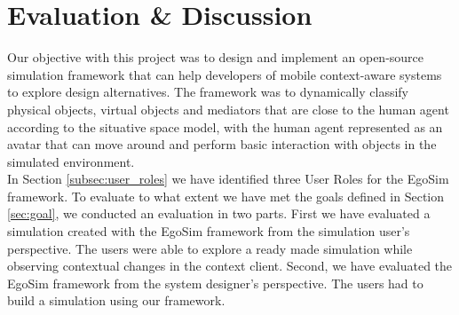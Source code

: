 \chapter{Evaluation \& Discussion}\label{ch:evaluation}
Our objective with this project was to design and implement an open-source simulation framework that can help developers of mobile context-aware systems to explore design alternatives. The framework was to dynamically classify physical objects, virtual objects and mediators that are close to the human agent according to the situative space model, with the human agent represented as an avatar that can move around and perform basic interaction with objects in the simulated environment.\\

In Section \ref{subsec:user_roles} we have identified three User Roles for the EgoSim framework. To evaluate to what extent we have met the goals defined in Section \ref{sec:goal}, we conducted an evaluation in two parts. First we have evaluated a simulation created with the EgoSim framework from the simulation user's perspective. The users were able to explore a ready made simulation while observing contextual changes in the context client. Second, we have evaluated the EgoSim framework from the system designer's perspective. The users had to build a simulation using our framework.\\






